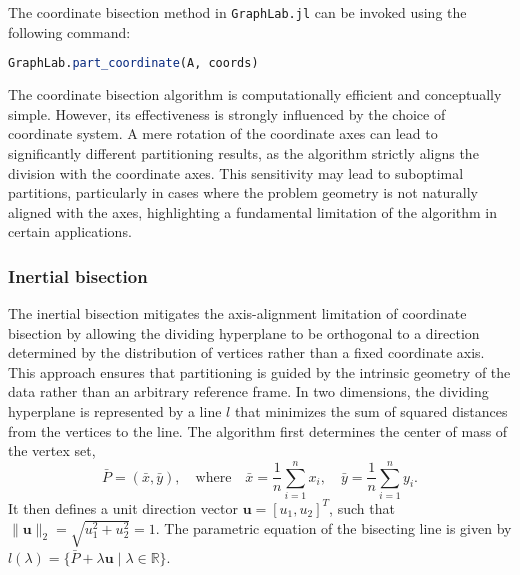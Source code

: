 \documentclass[../paper.tex]{subfiles}
\begin{document}
    The coordinate bisection method in \texttt{GraphLab.jl} can be invoked using the following command:
    
    \begin{lstlisting}[language=Julia]
    GraphLab.part_coordinate(A, coords)
    \end{lstlisting}
    
    The coordinate bisection algorithm is computationally efficient and conceptually simple.
    However, its effectiveness is strongly influenced by the choice of coordinate system.
    A mere rotation of the coordinate axes can lead to significantly different partitioning results,
    as the algorithm strictly aligns the division with the coordinate axes.
    This sensitivity may lead to suboptimal partitions, particularly in cases where the problem geometry
    is not naturally aligned with the axes, highlighting a fundamental limitation of the algorithm in certain applications.
    \subsubsection{Inertial bisection}
    The inertial bisection mitigates the axis-alignment limitation of coordinate bisection by
    allowing the dividing hyperplane to be orthogonal to a direction determined by the
    distribution of vertices rather than a fixed coordinate axis. This approach ensures that
    partitioning is guided by the intrinsic geometry of the data rather than an arbitrary reference frame.
    In two dimensions, the dividing hyperplane is
    represented by a line $l$ that minimizes the sum
    of squared distances from the vertices to the line. The algorithm first determines the center of mass of the vertex set,
    \begin{equation}
      \bar{P}=(\bar{x}, \bar{y}), \quad \text{where} \quad  \bar{x} = \frac{1}{n}\sum_{i=1}^n x_i, \quad \bar{y} = \frac{1}{n}\sum_{i=1}^n y_i\text{.}
    \end{equation}
    It then defines a unit direction vector $\mathbf{u}=[u_1, u_2]^T$, such that 
    $\|\mathbf{u}\|_2 = \sqrt{u_1^2+u_2^2} = 1$.
    The parametric equation
    of the bisecting line is given by
    $l(\lambda) = \{\bar{P} + \lambda \mathbf{u}  \mid \lambda \in \mathbb{R} \}$.
    
    
    
    
\end{document}
